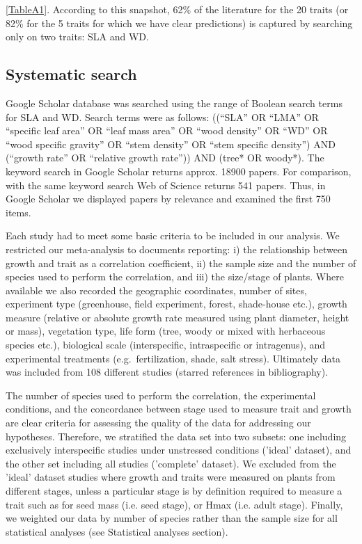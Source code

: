 \documentclass[a4paper]{article}\usepackage[]{graphicx}\usepackage[]{color}
\begin{document}
\ref{TableA1}. According to this snapshot, 62\% of the literature for the 20 traits (or 82\% for the 5 traits for which we have clear predictions) is captured by searching only on two traits: SLA and WD.

\subsection*{Systematic search}\label{systematic-search}

Google Scholar database was searched using the range of Boolean search terms for SLA and WD. Search terms were as follows: ((``SLA'' OR ``LMA'' OR ``specific leaf area'' OR ``leaf mass area'' OR ``wood density'' OR ``WD'' OR ``wood specific gravity'' OR ``stem density'' OR ``stem specific density'') AND (``growth rate'' OR ``relative growth rate'')) AND (tree* OR woody*). The keyword search in Google Scholar returns approx. 18900 papers. For comparison, with the same keyword search Web of Science returns 541 papers. Thus, in Google Scholar we displayed papers by relevance and examined the first 750 items. 

Each study had to meet some basic criteria to be included in our analysis. We restricted our meta-analysis to documents reporting: i) the relationship between growth and trait as a correlation coefficient, ii) the sample size and the number of species used to perform the correlation, and iii) the size/stage of plants. Where available we also recorded the geographic coordinates, number of sites, experiment type (greenhouse, field experiment, forest, shade-house etc.), growth measure (relative or absolute growth rate measured using plant diameter, height or mass), vegetation type, life form (tree, woody or mixed with herbaceous species etc.), biological scale (interspecific, intraspecific or intragenus), and experimental treatments (e.g.~fertilization, shade, salt stress). Ultimately data was included from 108 different studies (starred references in bibliography).

The number of species used to perform the correlation, the experimental conditions, and the concordance between stage used to measure trait and growth are clear criteria for assessing the quality of the data for addressing our hypotheses. Therefore, we stratified the data set into two subsets: one including exclusively interspecific studies under unstressed conditions ('ideal' dataset), and the other set including all studies ('complete' dataset). We excluded from the 'ideal' dataset studies where growth and traits were measured on plants from different stages, unless a particular stage is by definition required to measure a trait such as for seed mass (i.e. seed stage), or Hmax (i.e. adult stage). Finally, we weighted our data by number of species rather than the sample size for all statistical analyses (see Statistical analyses section).
\end{document}
